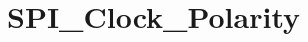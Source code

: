 \hypertarget{group___s_p_i___clock___polarity}{\section{S\-P\-I\-\_\-\-Clock\-\_\-\-Polarity}
\label{group___s_p_i___clock___polarity}
}
